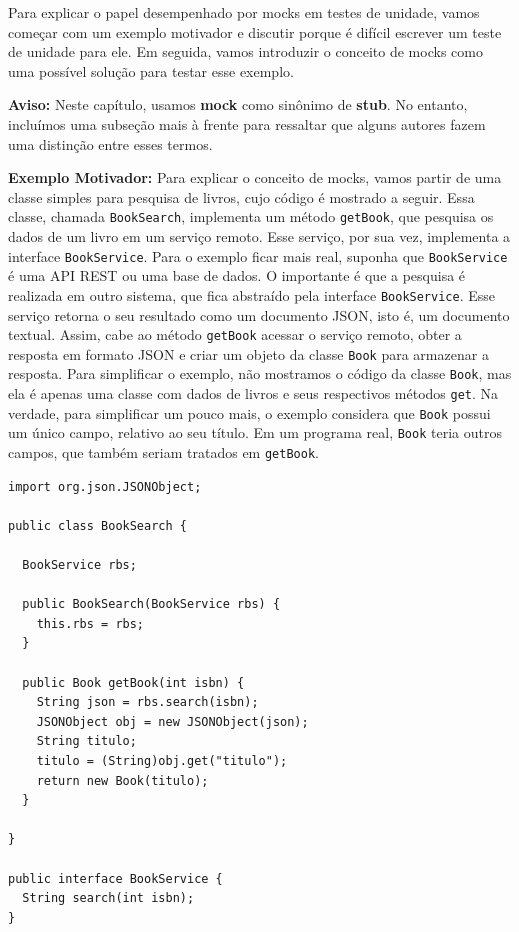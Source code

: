 \documentclass[
  11pt,
  twoside]{book}
\newcommand{\passthrough}[1]{#1}
\newenvironment{aviso}{\centering \vspace{1.5ex} \begin{tcolorbox}[breakable, colback=backcolor, width=4.9in]}{\end{tcolorbox} \vspace{1.5ex}}
\begin{document}
 

Para explicar o papel desempenhado por mocks em testes de unidade, vamos
começar com um exemplo motivador e discutir porque é difícil escrever um
teste de unidade para ele. Em seguida, vamos introduzir o conceito de
mocks como uma possível solução para testar esse exemplo.


\begin{aviso}

\textbf{Aviso:} Neste capítulo, usamos \textbf{mock} como sinônimo de
\textbf{stub}. No entanto, incluímos uma subseção mais à frente para
ressaltar que alguns autores fazem uma distinção entre esses termos.

\end{aviso}

\textbf{Exemplo Motivador:} Para explicar o conceito de mocks, vamos
partir de uma classe simples para pesquisa de livros, cujo código é
mostrado a seguir. Essa classe, chamada
\passthrough{\lstinline!BookSearch!}, implementa um método
\passthrough{\lstinline!getBook!}, que pesquisa os dados de um livro em
um serviço remoto. Esse serviço, por sua vez, implementa a interface
\passthrough{\lstinline!BookService!}. Para o exemplo ficar mais real,
suponha que \passthrough{\lstinline!BookService!} é uma API REST ou uma
base de dados. O importante é que a pesquisa é realizada em outro
sistema, que fica abstraído pela interface
\passthrough{\lstinline!BookService!}. Esse serviço retorna o seu
resultado como um documento JSON, isto é, um documento textual. Assim,
cabe ao método \passthrough{\lstinline!getBook!} acessar o serviço
remoto, obter a resposta em formato JSON e criar um objeto da classe
\passthrough{\lstinline!Book!} para armazenar a resposta. Para
simplificar o exemplo, não mostramos o código da classe
\passthrough{\lstinline!Book!}, mas ela é apenas uma classe com dados de
livros e seus respectivos métodos \passthrough{\lstinline!get!}. Na
verdade, para simplificar um pouco mais, o exemplo considera que
\passthrough{\lstinline!Book!} possui um único campo, relativo ao seu
título. Em um programa real, \passthrough{\lstinline!Book!} teria outros
campos, que também seriam tratados em \passthrough{\lstinline!getBook!}.

\begin{lstlisting}
import org.json.JSONObject;

public class BookSearch {

  BookService rbs;

  public BookSearch(BookService rbs) {
    this.rbs = rbs;
  }

  public Book getBook(int isbn) {
    String json = rbs.search(isbn);
    JSONObject obj = new JSONObject(json);
    String titulo;
    titulo = (String)obj.get("titulo");
    return new Book(titulo);
  }

}

public interface BookService {
  String search(int isbn);
}
\end{lstlisting}
\end{document}
